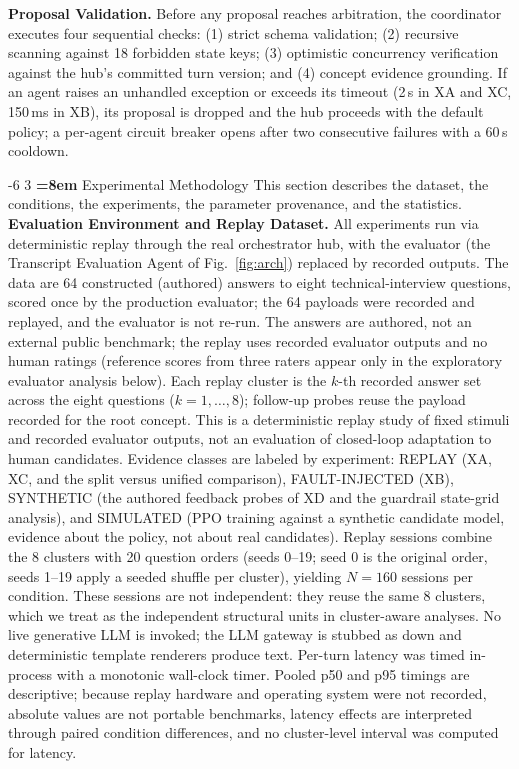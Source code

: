 \documentclass[runningheads,a4paper]{llncs}
\makeatletter
\renewcommand\section{\@startsection{section}{1}{\z@}%
                       {-6\p@ \@plus -1\p@ \@minus -1\p@}%
                       {3\p@ \@plus 1\p@ \@minus 1\p@}%
                       {\normalfont\large\bfseries\boldmath
                        \rightskip=\z@ \@plus 8em\pretolerance=10000 }}
\makeatother
\begin{document}
\textbf{Proposal Validation.} Before any proposal reaches arbitration, the coordinator executes four sequential checks: (1) strict schema validation; (2) recursive scanning against 18 forbidden state keys; (3) optimistic concurrency verification against the hub's committed turn version; and (4) concept evidence grounding. If an agent raises an unhandled exception or exceeds its timeout (2\,s in XA and XC, 150\,ms in XB), its proposal is dropped and the hub proceeds with the default policy; a per-agent circuit breaker opens after two consecutive failures with a 60\,s cooldown.

\section{Experimental Methodology}\label{sec:method}
This section describes the dataset, the conditions, the experiments, the parameter provenance, and the statistics.
\textbf{Evaluation Environment and Replay Dataset.} All experiments run via deterministic replay through the real orchestrator hub, with the evaluator (the Transcript Evaluation Agent of Fig.~\ref{fig:arch}) replaced by recorded outputs. The data are 64 constructed (authored) answers to eight technical-interview questions, scored once by the production evaluator; the 64 payloads were recorded and replayed, and the evaluator is not re-run. The answers are authored, not an external public benchmark; the replay uses recorded evaluator outputs and no human ratings (reference scores from three raters appear only in the exploratory evaluator analysis below). Each replay cluster is the $k$-th recorded answer set across the eight questions ($k=1,\ldots,8$); follow-up probes reuse the payload recorded for the root concept. This is a deterministic replay study of fixed stimuli and recorded evaluator outputs, not an evaluation of closed-loop adaptation to human candidates. Evidence classes are labeled by experiment: REPLAY (XA, XC, and the split versus unified comparison), FAULT-INJECTED (XB), SYNTHETIC (the authored feedback probes of XD and the guardrail state-grid analysis), and SIMULATED (PPO training against a synthetic candidate model, evidence about the policy, not about real candidates). Replay sessions combine the 8 clusters with 20 question orders (seeds 0--19; seed 0 is the original order, seeds 1--19 apply a seeded shuffle per cluster), yielding $N=160$ sessions per condition. These sessions are not independent: they reuse the same 8 clusters, which we treat as the independent structural units in cluster-aware analyses. No live generative LLM is invoked; the LLM gateway is stubbed as down and deterministic template renderers produce text. Per-turn latency was timed in-process with a monotonic wall-clock timer. Pooled p50 and p95 timings are descriptive; because replay hardware and operating system were not recorded, absolute values are not portable benchmarks, latency effects are interpreted through paired condition differences, and no cluster-level interval was computed for latency.
\end{document}
